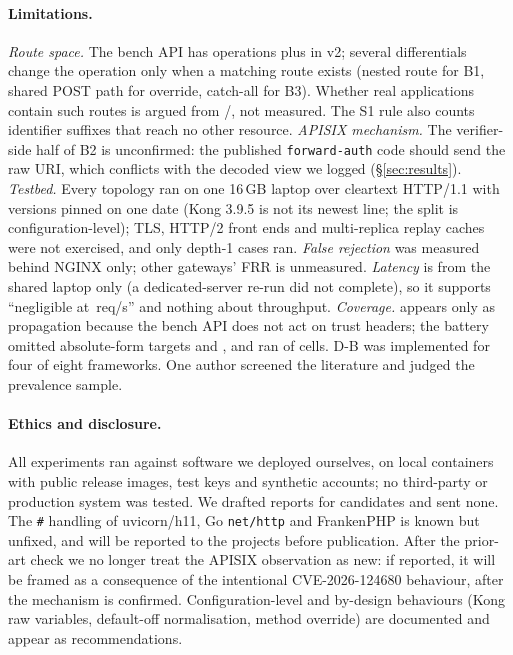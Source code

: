 \paragraph{Limitations.}\label{sec:discussion:lim}
\emph{Route space.} The bench API has \NumBenchOps{} operations plus
\NumNewRoutes{} in v2; several differentials change the operation only when a
matching route exists (nested route for B1, shared POST path for override,
catch-all for B3). Whether real applications contain such routes is argued
from /, not measured. The S1 rule also counts identifier
suffixes that reach no other resource.
\emph{APISIX mechanism.} The verifier-side half of B2 is unconfirmed: the
published \texttt{forward-auth} code should send the raw URI, which conflicts
with the decoded view we logged (\S\ref{sec:results}).
\emph{Testbed.} Every topology ran on one 16\,GB laptop over cleartext
HTTP/1.1 with versions pinned on one date (Kong 3.9.5 is not its newest
line; the split is configuration-level); TLS, HTTP/2 front ends and
multi-replica replay caches were not exercised, and only depth-1 cases ran.
\emph{False rejection} was measured behind NGINX only; other gateways' FRR is
unmeasured. \emph{Latency} is from the shared laptop only (a dedicated-server
re-run did not complete), so it supports ``negligible at \PerfRate{}\,req/s''
and nothing about throughput.
\emph{Coverage.} \GC appears only as propagation because the bench API does
not act on trust headers; the \Aclient battery omitted absolute-form targets
and , and ran \NumEFourTopologies{} of \NumEFourCells{}
cells. D-B was implemented for four of eight frameworks. One author screened
the literature and judged the prevalence sample.

\paragraph{Ethics and disclosure.}\label{sec:discussion:ethics} All experiments
ran against software we deployed ourselves, on local containers with public
release images, test keys and synthetic accounts; no third-party or production
system was tested. We drafted reports for \NumDisclosures{} candidates and
sent none. The \texttt{\#} handling of uvicorn/h11, Go \texttt{net/http} and
FrankenPHP is known but unfixed, and will be reported to the projects before
publication. After the prior-art check we no longer treat the APISIX
observation as new: if reported, it will be framed as a consequence of the
intentional CVE-2026-124680 behaviour, after the mechanism is confirmed.
Configuration-level and by-design behaviours (Kong raw variables, default-off
normalisation, method override) are documented and appear as recommendations.
